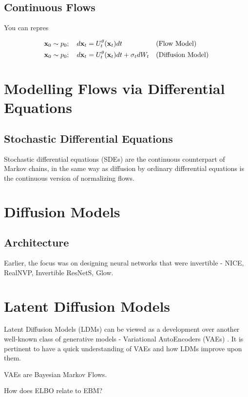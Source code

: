 \documentclass[a4paper, 11pt]{article}
\begin{document}
\subsection{Continuous Flows}

You can repres

\begin{align}
    \mbox{$\mbox{$\mathbf{x}$}$}_0 \sim p_0; \quad d\mbox{$\mbox{$\mathbf{x}$}$}_t &= U_t^{\theta}(\mbox{$\mbox{$\mathbf{x}$}$}_t) dt && \text{(Flow Model)} \\
    \mbox{$\mbox{$\mathbf{x}$}$}_0 \sim p_0; \quad d\mbox{$\mbox{$\mathbf{x}$}$}_t &= U_t^{\theta}(\mbox{$\mbox{$\mathbf{x}$}$}_t) dt + \sigma_t dW_t && \text{(Diffusion Model)}
\end{align}


\section{Modelling Flows via Differential Equations}

\subsection{Stochastic Differential Equations}
Stochastic differential equations (SDEs) are the continuous counterpart of Markov chains, in the same way
as diffusion by ordinary differential equations is the continuous version of normalizing flows.

\section{Diffusion Models}


\subsection{Architecture}
Earlier, the focus was on designing neural networks that were invertible - NICE, RealNVP, Invertible ResNetS, Glow.

\section{Latent Diffusion Models}

Latent Diffusion Models (LDMs) can be viewed as a development over another well-known class of generative models - Variational AutoEncoders (VAEs) \cite{dieleman2023perspectives}. It is pertinent to have a quick understanding of VAEs and how LDMs improve upon them.

VAEs are Bayesian Markov Flows.

How does ELBO relate to EBM? 
\end{document}
